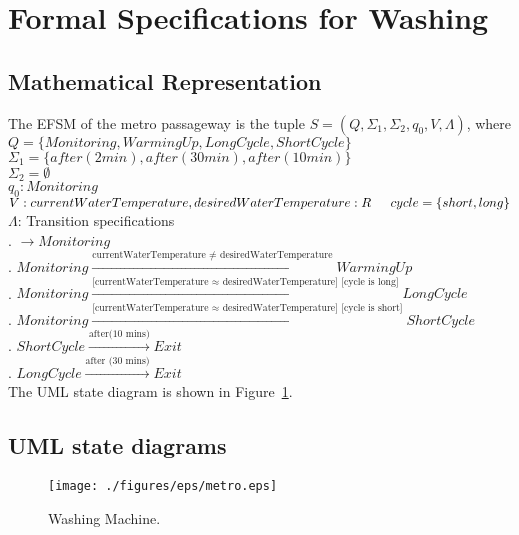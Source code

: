 \newpage
\section{Formal Specifications for Washing}

\subsection{Mathematical Representation}

\noindent The EFSM of the metro passageway is the tuple $S = (Q, \Sigma_1, \Sigma_2, q_0, V, \Lambda)$, where\\

\noindent $Q = \{Monitoring, Warming Up, Long Cycle, Short Cycle\}$\\
\noindent $\Sigma_1 = \{after(2min), after(30min), after(10min)\}$\\
\noindent $\Sigma_2 = \emptyset$\\
\noindent $q_0: Monitoring$\\
\noindent $V: currentWaterTemperature, desiredWaterTemperature: R \\
\indent cycle = \{short, long\}$\\
\noindent $\Lambda$: Transition specifications\\
. $\rightarrow Monitoring$\\
. $Monitoring \xrightarrow {\text {currentWaterTemperature $\neq$ desiredWaterTemperature}} Warming Up$\\
. $Monitoring \xrightarrow {\text {[currentWaterTemperature $\approx$ desiredWaterTemperature] [cycle is long]}} Long Cycle$\\
. $Monitoring \xrightarrow {\text {[currentWaterTemperature $\approx$ desiredWaterTemperature] [cycle is short]}} Short Cycle$\\
. $Short Cycle \xrightarrow {\text {after(10 mins)}} Exit$\\
. $Long Cycle \xrightarrow {\text {after (30 mins)}} Exit$\\

\noindent The UML state diagram is shown in Figure~\ref{fig:Washing}.

\newpage

\subsection{UML state diagrams}

\begin{figure}[h!]
	\centering
		\texttt{[image: ./figures/eps/metro.eps]}
		  \caption{Washing Machine.}
  \label{fig:Washing}
\end{figure}
